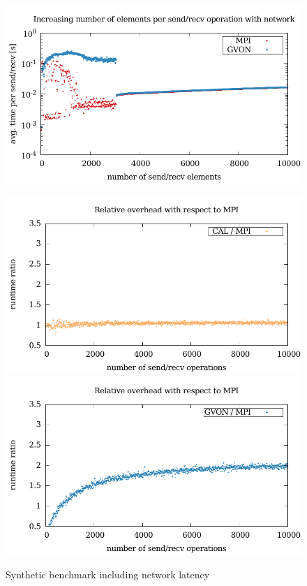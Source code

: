 \begin{figure}[H]
\begin{minipage}[t]{0.5\textwidth}
    \includegraphics[width=\textwidth]{plots/50_nsize_network_gvon_kepler}
  \end{minipage}%
  \begin{minipage}[t]{0.5\textwidth}
    \includegraphics[width=\textwidth]{plots/50_nsend_network_overhead_cal_kepler}
    \includegraphics[width=\textwidth]{plots/50_nsend_network_overhead_gvon_kepler}
  \end{minipage}%
  \caption{Synthetic benchmark including network latency}
  \label{fig:nsend_network}
\end{figure}

